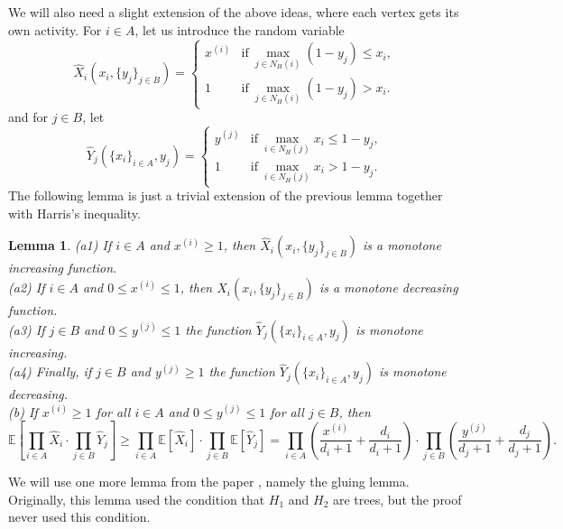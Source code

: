 \documentclass[12pt,a4paper]{amsart}
\numberwithin{equation}{section}
\theoremstyle{plain}
\newtheorem{Lemma}[Th]{Lemma}
\theoremstyle{definition}
\newcommand{\1}{\textbf{1}}
\newcommand{\E}{\mathbb{E}}
\begin{document}
We will also need a slight extension of the above ideas, where each vertex gets its own activity.
For $i\in A$, let us introduce the random variable
$$\widehat{X}_{i}(x_i,\{y_j\}_{j\in B})=\left\{ \begin{array}{ll}
x^{(i)} & \mbox{if}\ \max_{j\in N_H(i)}(1-y_j)\leqslant   x_i,\\
1 & \mbox{if}\ \max_{j\in N_H(i)}(1-y_j)> x_i.
\end{array} \right.$$
and for $j\in B$, let
$$\widehat{Y}_{j}(\{x_i\}_{i \in A},y_j)=\left\{ \begin{array}{ll}
y^{(j)} & \mbox{if}\ \max_{i\in N_H(j)}x_i\leqslant   1-y_j,\\
1 & \mbox{if}\ \max_{i\in N_H(j)}x_i>1-y_j.
\end{array} \right.$$
The following lemma  is just a trivial extension of the previous lemma together with Harris's inequality.

\begin{Lemma} \label{extension}
(a1) If $i\in A$ and  $x^{(i)}\geqslant 1$, then $\widehat{X}_{i}(x_i,\{y_j\}_{j\in B})$ is a monotone increasing function. \\
(a2) If $i\in A$ and $0\leqslant   x^{(i)}\leqslant 1$, then $\widehat{X}_{i}(x_i,\{y_j\}_{j\in B})$ is a monotone decreasing function. \\
(a3) If $j\in B$ and $0\leqslant   y^{(j)}\leqslant 1$ the function $\widehat{Y}_{j}(\{x_i\}_{i \in A},y_j)$ is monotone increasing.\\ 
(a4) Finally, if $j\in B$ and $y^{(j)}\geqslant 1$ the function $\widehat{Y}_{j}(\{x_i\}_{i \in A},y_j)$ is monotone decreasing.\\
(b) If $x^{(i)}\geqslant1$ for all $i\in A$ and $0\leqslant   y^{(j)}\leqslant   1$ for all $j\in B$, then
$$\E\left[ \prod_{i\in A}\widehat{X}_i\cdot \prod_{j\in B}\widehat{Y}_j\right]\geqslant \prod_{i\in A}\E[\widehat{X}_i]\cdot \prod_{j\in B}\E [\widehat{Y}_j]=\prod_{i\in A}\left(\frac{x^{(i)}}{d_i+1}+\frac{d_i}{d_i+1}\right)\cdot \prod_{j\in B}\left(\frac{y^{(j)}}{d_j+1}+\frac{d_j}{d_j+1}\right).$$
\end{Lemma}

We will use one more lemma from the paper \cite{beke2024permutation}, namely the gluing lemma. Originally, this lemma used the condition that $H_1$ and $H_2$ are trees, but the proof never used this condition.
\end{document}
